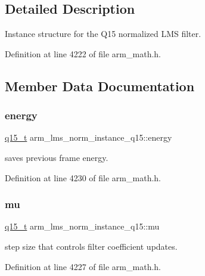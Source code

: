 \subsection{Detailed Description}
Instance structure for the Q15 normalized L\+MS filter. 

Definition at line 4222 of file arm\+\_\+math.\+h.



\subsection{Member Data Documentation}
\mbox{\label{structarm__lms__norm__instance__q15_a1c81ded399919d8181026bc1c8602e7b}} 
\subsubsection{\texorpdfstring{energy}{energy}}
{\footnotesize\ttfamily \hyperlink{arm__math_8h_ab5a8fb21a5b3b983d5f54f31614052ea}{q15\+\_\+t} arm\+\_\+lms\+\_\+norm\+\_\+instance\+\_\+q15\+::energy}

saves previous frame energy. 

Definition at line 4230 of file arm\+\_\+math.\+h.

\mbox{\label{structarm__lms__norm__instance__q15_a7ce00f21d11cfda6d963240641deea8c}} 
\subsubsection{\texorpdfstring{mu}{mu}}
{\footnotesize\ttfamily \hyperlink{arm__math_8h_ab5a8fb21a5b3b983d5f54f31614052ea}{q15\+\_\+t} arm\+\_\+lms\+\_\+norm\+\_\+instance\+\_\+q15\+::mu}

step size that controls filter coefficient updates. 

Definition at line 4227 of file arm\+\_\+math.\+h.

\mbox{\label{structarm__lms__norm__instance__q15_a9ee7a45f4f315d7996a969e25fdc7146}} 
